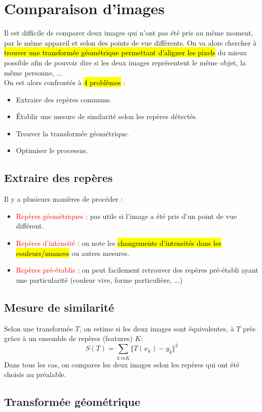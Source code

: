 \documentclass[letterpaper, 12pt]{article}
\newcommand{\alinea}{
\hspace*{0.5cm}}
\newcommand{\red}[1]{
	\textcolor{red}{#1}}
\begin{document}
\section{Comparaison d'images}
	\alinea Il est difficile de comparer deux images qui n'ont pas été pris au même moment, par le même appareil et selon des
		points de vue différents. On va alors chercher à \hl{trouver une transformée géométrique permettant d'aligner les pixels}
		du mieux possible afin de pouvoir dire si les deux images représentent le même objet, la même personne, ...\\
		On est alors confrontés à \hl{4 problèmes} :
		\begin{itemize}
			\setlength\itemsep{0cm}
			\item Extraire des repères communs.
			\item \'Etablir une mesure de similarité selon les repères détectés.
			\item Trouver la transformée géométrique.
			\item Optimiser le processus.
		\end{itemize}
	\subsection{Extraire des repères}
		\alinea Il y a plusieurs manières de procéder : 
		\begin{itemize}
			\setlength\itemsep{0cm}
			\item \red{Repères géométriques} : pas utile si l'image a été pris d'un point de vue différent.
			\item \red{Repères d'intensité} : on note les \hl{changements d'intensités dans les couleurs/nuances} ou autres mesures.
			\item \red{Repères pré-établis} : on peut facilement retrouver des repères pré-établi ayant une particularité (couleur vive,
				forme particulière, ...)
		\end{itemize}
	\subsection{Mesure de similarité}
		\alinea Selon une transformée $T$, on estime si les deux images sont équivalentes, à $T$ près grâce à un ensemble 
			de repères (features) $K$:
		$$ S(T) = \sum\limits_{k \ in K} \Vert T(x_k) - y_k \Vert^2 $$
		Dans tous les cas, on compares les deux images selon les repères qui ont été choisis au préalable.
	\subsection{Transformée géométrique}
\end{document}
